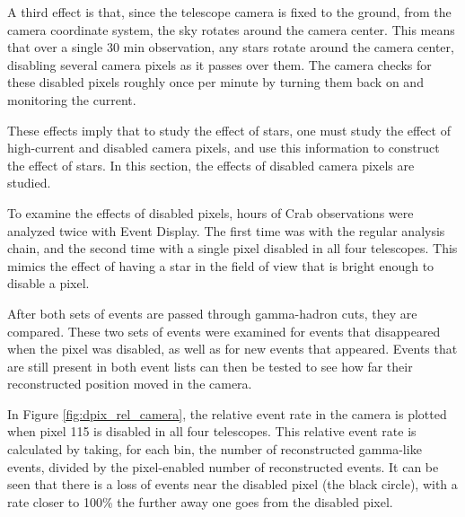     A third effect is that, since the telescope camera is fixed to the ground, from the camera coordinate system, the sky rotates around the camera center.
    This means that over a single 30 min observation, any stars rotate around the camera center, disabling several camera pixels as it passes over them.
    The camera checks for these disabled pixels roughly once per minute by turning them back on and monitoring the current.

    These effects imply that to study the effect of stars, one must study the effect of high-current and disabled camera pixels, and use this information to construct the effect of stars.
    In this section, the effects of disabled camera pixels are studied.

    To examine the effects of disabled pixels,  hours of Crab observations were analyzed twice with Event Display.
    The first time was with the regular analysis chain, and the second time with a single pixel disabled in all four telescopes.
    This mimics the effect of having a star in the field of view that is bright enough to disable a pixel.

    After both sets of events are passed through gamma-hadron cuts, they are compared.
    These two sets of events were examined for events that disappeared when the pixel was disabled, as well as for new events that appeared.
    Events that are still present in both event lists can then be tested to see how far their reconstructed position moved in the camera.

    In Figure \ref{fig:dpix_rel_camera}, the relative event rate in the camera is plotted when pixel 115 is disabled in all four telescopes.
    This relative event rate is calculated by taking, for each bin, the number of reconstructed gamma-like events, divided by the pixel-enabled number of reconstructed events.
    It can be seen that there is a loss of events near the disabled pixel (the black circle), with a rate closer to 100\% the further away one goes from the disabled pixel.

